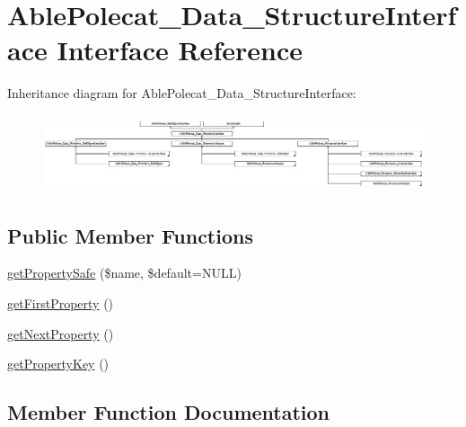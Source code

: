 \hypertarget{interface_able_polecat___data___structure_interface}{}\section{Able\+Polecat\+\_\+\+Data\+\_\+\+Structure\+Interface Interface Reference}
\label{interface_able_polecat___data___structure_interface}
Inheritance diagram for Able\+Polecat\+\_\+\+Data\+\_\+\+Structure\+Interface\+:\begin{figure}[H]
\begin{center}
\leavevmode
\includegraphics[height=2.268518cm]{interface_able_polecat___data___structure_interface}
\end{center}
\end{figure}
\subsection*{Public Member Functions}
\begin{DoxyCompactItemize}
\item 
\hyperlink{interface_able_polecat___data___structure_interface_a3a24ae252c958a2cdf2d464ddf7d030e}{get\+Property\+Safe} (\$name, \$default=N\+U\+L\+L)
\item 
\hyperlink{interface_able_polecat___data___structure_interface_aba04483e211e71f653da4ab2d79c97ca}{get\+First\+Property} ()
\item 
\hyperlink{interface_able_polecat___data___structure_interface_a758ffef4182dceef4245a5745960e1d7}{get\+Next\+Property} ()
\item 
\hyperlink{interface_able_polecat___data___structure_interface_aa6ad40c977a59df17b723c0bd74460f4}{get\+Property\+Key} ()
\end{DoxyCompactItemize}


\subsection{Member Function Documentation}
\hypertarget{interface_able_polecat___data___structure_interface_aba04483e211e71f653da4ab2d79c97ca}{}
